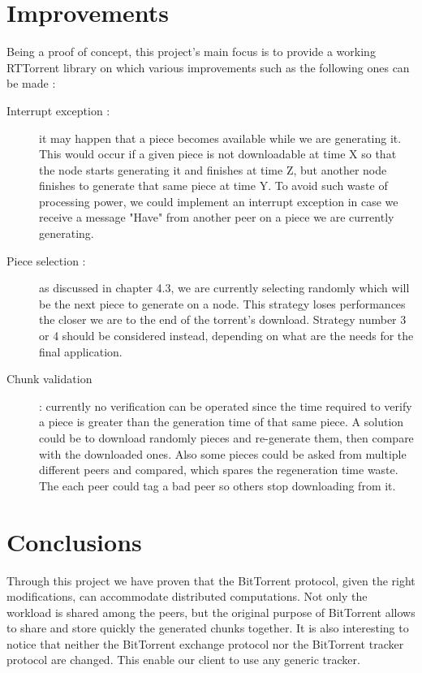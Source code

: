 \documentclass[a4paper]{article}
\begin{document}
{\section{Improvements}

Being a proof of concept, this project's main focus is to provide a working RTTorrent library on which various improvements such as the following ones can be made :\\

\begin{description}
	\item [Interrupt exception : ] it may happen that a piece becomes available while we are generating it. This would occur if a given piece is not downloadable at time X so that the node starts generating it and finishes at time Z, but another node finishes to generate that same piece at time Y. To avoid such waste of processing power, we could implement an interrupt exception in case we receive a message "Have" from another peer on a piece we are currently generating.\\
	
	\item [Piece selection : ] as discussed in chapter 4.3, we are currently selecting randomly which will be the next piece to generate on a node. This strategy loses performances the closer we are to the end of the torrent's download. Strategy number 3 or 4 should be considered instead, depending on what are the needs for the final application.\\
	
	\item [Chunk validation] : currently no verification can be operated since the time required to verify a piece is greater than the generation time of that same piece. A solution could be to download randomly pieces and re-generate them, then compare with the downloaded ones. Also some pieces could be asked from multiple different peers and compared, which spares the regeneration time waste. The each peer could tag a bad peer so others stop downloading from it.
\end{description}

\section{Conclusions}

Through this project we have proven that the BitTorrent protocol, given the right modifications, can accommodate distributed computations. Not only the workload is shared among the peers, but the original purpose of BitTorrent allows to share and store quickly the generated chunks together. It is also interesting to notice that neither the BitTorrent exchange protocol nor the BitTorrent tracker protocol are changed. This enable our client to use any generic tracker.\\

}
\end{document}
